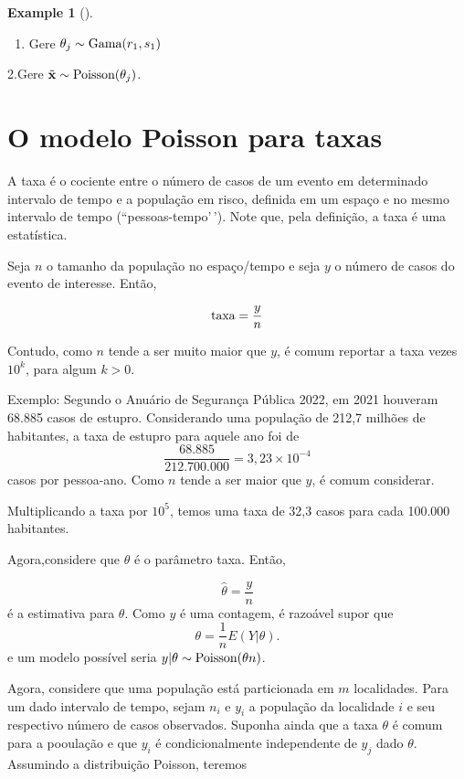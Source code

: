 \documentclass[
  letterpaper,
  DIV=11,
  numbers=noendperiod]{scrreprt}
\providecommand{\tightlist}{%
  \setlength{\itemsep}{0pt}\setlength{\parskip}{0pt}}\usepackage{longtable,booktabs,array}
\theoremstyle{definition}
\theoremstyle{plain}
\theoremstyle{definition}
\newtheorem{example}{Example}[chapter]
\theoremstyle{remark}
\begin{document}
\begin{example}[]
\begin{enumerate}
\def\labelenumi{\arabic{enumi}.}
\tightlist
\item
  Gere \(\theta_j\sim\hbox{Gama}(r_1,s_1)\)
\end{enumerate}

2.Gere \(\tilde{\mathbf{x}}\sim\hbox{Poisson}(\theta_j)\).

\section{O modelo Poisson para taxas}\label{o-modelo-poisson-para-taxas}

A taxa é o cociente entre o número de casos de um evento em determinado
intervalo de tempo e a população em risco, definida em um espaço e no
mesmo intervalo de tempo (``pessoas-tempo'\,'). Note que, pela
definição, a taxa é uma estatística.

Seja \(n\) o tamanho da população no espaço/tempo e seja \(y\) o número
de casos do evento de interesse. Então,

\[\hbox{taxa} = \frac{y}{n}\]

Contudo, como \(n\) tende a ser muito maior que \(y\), é comum reportar
a taxa vezes \(10^k\), para algum \(k>0\).

Exemplo: Segundo o Anuário de Segurança Pública 2022, em 2021 houveram
68.885 casos de estupro. Considerando uma população de 212,7 milhões de
habitantes, a taxa de estupro para aquele ano foi de
\[\frac{68.885}{212.700.000}=3,23\times 10^{-4}\] casos por pessoa-ano.
Como \(n\) tende a ser maior que \(y\), é comum considerar.

Multiplicando a taxa por \(10^5\), temos uma taxa de 32,3 casos para
cada 100.000 habitantes.

Agora,considere que \(\theta\) é o parâmetro taxa. Então,

\[\hat{\theta}=\frac{y}{n}\] é a estimativa para \(\theta\). Como \(y\)
é uma contagem, é razoável supor que \[\theta =\frac{1}{n}E(Y|\theta).\]
e um modelo possível seria \(y|\theta\sim\hbox{Poisson}(\theta n)\).

Agora, considere que uma população está particionada em \(m\)
localidades. Para um dado intervalo de tempo, sejam \(n_i\) e \(y_i\) a
população da localidade \(i\) e seu respectivo número de casos
observados. Suponha ainda que a taxa \(\theta\) é comum para a pooulação
e que \(y_i\) é condicionalmente independente de \(y_j\) dado
\(\theta\). Assumindo a distribuição Poisson, teremos


\end{example}
\end{document}
